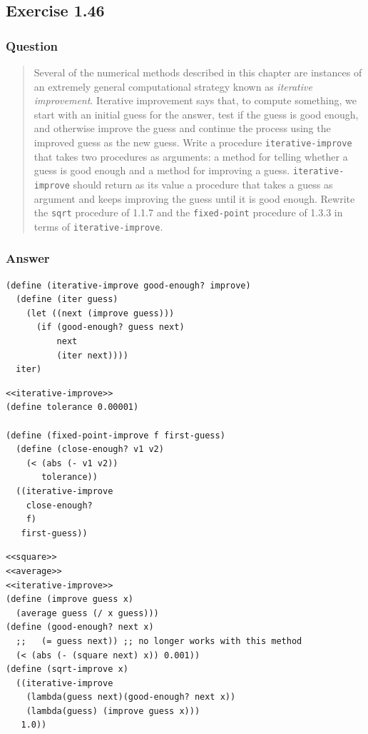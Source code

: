 \documentclass[final,fleqn,titlepage,twoside]{article}
\begin{document}
\subsection{Exercise 1.46}
\label{sec:org0dfffe9}
\subsubsection{Question}
\label{sec:org63defe2}
\begin{quote}
Several of the numerical methods described in this chapter are instances of an
extremely general computational strategy known as \emph{iterative improvement}.
Iterative improvement says that, to compute something, we start with an initial
guess for the answer, test if the guess is good enough, and otherwise improve
the guess and continue the process using the improved guess as the new guess.
Write a procedure \texttt{iterative-improve} that takes two procedures as
arguments: a method for telling whether a guess is good enough and a method for
improving a guess. \texttt{iterative-improve} should return as its value a
procedure that takes a guess as argument and keeps improving the guess until it
is good enough. Rewrite the \texttt{sqrt} procedure of 1.1.7 and the
\texttt{fixed-point} procedure of 1.3.3 in terms of
\texttt{iterative-improve}.
\end{quote}

\subsubsection{Answer}
\label{sec:org174cf94}
\begin{verbatim}
(define (iterative-improve good-enough? improve)
  (define (iter guess)
    (let ((next (improve guess)))
      (if (good-enough? guess next)
          next
          (iter next))))
  iter)
\end{verbatim}
\begin{verbatim}
<<iterative-improve>>
(define tolerance 0.00001)

(define (fixed-point-improve f first-guess)
  (define (close-enough? v1 v2)
    (< (abs (- v1 v2)) 
       tolerance))
  ((iterative-improve
    close-enough?
    f)
   first-guess))
\end{verbatim}
\begin{verbatim}
<<square>>
<<average>>
<<iterative-improve>>
(define (improve guess x)
  (average guess (/ x guess)))
(define (good-enough? next x)
  ;;   (= guess next)) ;; no longer works with this method
  (< (abs (- (square next) x)) 0.001))
(define (sqrt-improve x)
  ((iterative-improve
    (lambda(guess next)(good-enough? next x))
    (lambda(guess) (improve guess x)))
   1.0))
\end{verbatim}
\end{document}
